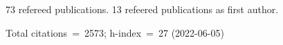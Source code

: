 73 refereed publications. 13 refeered publications as first author.

Total citations~=~2573; h-index~=~27 (2022-06-05)